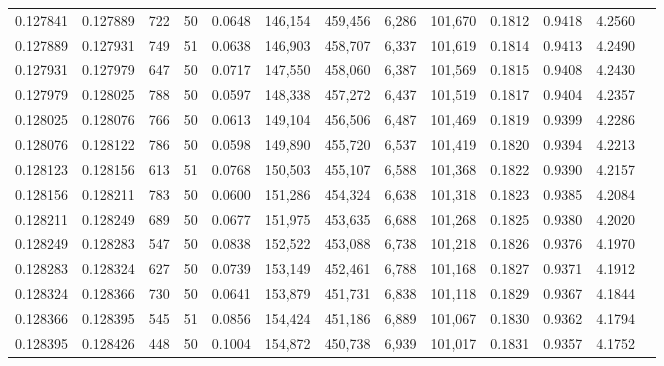 \begin{tabular}{rrrrrrrrrrrrr}
0.127841 & 0.127889 &   722 &  50 &                                     0.0648 & 146,154 & 459,456 &   6,286 & 101,670 & 0.1812 & 0.9418 & 4.2560 \\
0.127889 & 0.127931 &   749 &  51 &                                     0.0638 & 146,903 & 458,707 &   6,337 & 101,619 & 0.1814 & 0.9413 & 4.2490 \\
0.127931 & 0.127979 &   647 &  50 &                                     0.0717 & 147,550 & 458,060 &   6,387 & 101,569 & 0.1815 & 0.9408 & 4.2430 \\
0.127979 & 0.128025 &   788 &  50 &                                     0.0597 & 148,338 & 457,272 &   6,437 & 101,519 & 0.1817 & 0.9404 & 4.2357 \\
0.128025 & 0.128076 &   766 &  50 &                                     0.0613 & 149,104 & 456,506 &   6,487 & 101,469 & 0.1819 & 0.9399 & 4.2286 \\
0.128076 & 0.128122 &   786 &  50 &                                     0.0598 & 149,890 & 455,720 &   6,537 & 101,419 & 0.1820 & 0.9394 & 4.2213 \\
0.128123 & 0.128156 &   613 &  51 &                                     0.0768 & 150,503 & 455,107 &   6,588 & 101,368 & 0.1822 & 0.9390 & 4.2157 \\
0.128156 & 0.128211 &   783 &  50 &                                     0.0600 & 151,286 & 454,324 &   6,638 & 101,318 & 0.1823 & 0.9385 & 4.2084 \\
0.128211 & 0.128249 &   689 &  50 &                                     0.0677 & 151,975 & 453,635 &   6,688 & 101,268 & 0.1825 & 0.9380 & 4.2020 \\
0.128249 & 0.128283 &   547 &  50 &                                     0.0838 & 152,522 & 453,088 &   6,738 & 101,218 & 0.1826 & 0.9376 & 4.1970 \\
0.128283 & 0.128324 &   627 &  50 &                                     0.0739 & 153,149 & 452,461 &   6,788 & 101,168 & 0.1827 & 0.9371 & 4.1912 \\
0.128324 & 0.128366 &   730 &  50 &                                     0.0641 & 153,879 & 451,731 &   6,838 & 101,118 & 0.1829 & 0.9367 & 4.1844 \\
0.128366 & 0.128395 &   545 &  51 &                                     0.0856 & 154,424 & 451,186 &   6,889 & 101,067 & 0.1830 & 0.9362 & 4.1794 \\
0.128395 & 0.128426 &   448 &  50 &                                     0.1004 & 154,872 & 450,738 &   6,939 & 101,017 & 0.1831 & 0.9357 & 4.1752 \\

\end{tabular}
